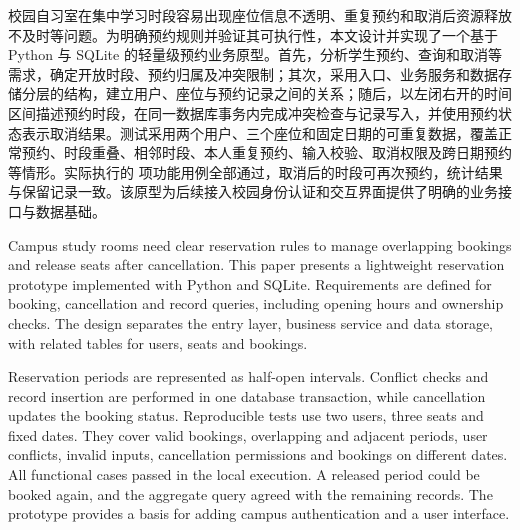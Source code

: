 \begin{cnabstract}
校园自习室在集中学习时段容易出现座位信息不透明、重复预约和取消后资源释放不及时等问题。为明确预约规则并验证其可执行性，本文设计并实现了一个基于 Python 与 SQLite 的轻量级预约业务原型。首先，分析学生预约、查询和取消等需求，确定开放时段、预约归属及冲突限制；其次，采用入口、业务服务和数据存储分层的结构，建立用户、座位与预约记录之间的关系；随后，以左闭右开的时间区间描述预约时段，在同一数据库事务内完成冲突检查与记录写入，并使用预约状态表示取消结果。测试采用两个用户、三个座位和固定日期的可重复数据，覆盖正常预约、时段重叠、相邻时段、本人重复预约、输入校验、取消权限及跨日期预约等情形。实际执行的 \SampleTestCount{} 项功能用例全部通过，取消后的时段可再次预约，统计结果与保留记录一致。该原型为后续接入校园身份认证和交互界面提供了明确的业务接口与数据基础。
\end{cnabstract}

\begin{enabstract}
Campus study rooms need clear reservation rules to manage overlapping bookings and release seats after cancellation. This paper presents a lightweight reservation prototype implemented with Python and SQLite. Requirements are defined for booking, cancellation and record queries, including opening hours and ownership checks. The design separates the entry layer, business service and data storage, with related tables for users, seats and bookings.

Reservation periods are represented as half-open intervals. Conflict checks and record insertion are performed in one database transaction, while cancellation updates the booking status. Reproducible tests use two users, three seats and fixed dates. They cover valid bookings, overlapping and adjacent periods, user conflicts, invalid inputs, cancellation permissions and bookings on different dates. All \SampleTestCount{} functional cases passed in the local execution. A released period could be booked again, and the aggregate query agreed with the remaining records. The prototype provides a basis for adding campus authentication and a user interface.
\end{enabstract}
